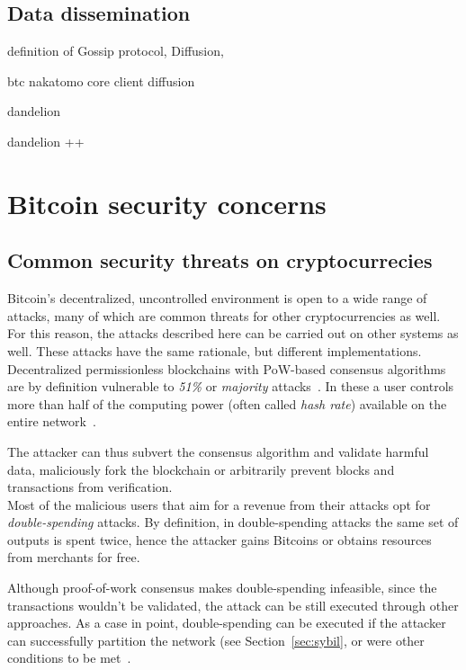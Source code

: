 \documentclass[12pt, letterpaper, twoside]{article}
\begin{document}
\subsection{Data dissemination}\label{sec:dissem}
definition of Gossip protocol, Diffusion,

btc nakatomo core client diffusion

dandelion

dandelion ++




\section{Bitcoin security concerns}\label{sec:securityintro}
\subsection{Common security threats on cryptocurrecies}
Bitcoin's decentralized, uncontrolled environment is open to a wide range of attacks, many of which are common threats for other cryptocurrencies as well. For this reason, the attacks described here can be carried out on other systems as well. These attacks have the same rationale, but different implementations.\\

Decentralized permissionless blockchains with PoW-based consensus algorithms are by definition vulnerable to \textit{51\%} or \textit{majority} attacks~\cite{nakamoto}. In these a user controls more than half of the computing power (often called \textit{hash rate}) available on the entire network~\cite{51atk}.

The attacker can thus subvert the consensus algorithm and validate harmful data, maliciously fork the blockchain or arbitrarily prevent blocks and transactions from verification.\\

Most of the malicious users that aim for a revenue from their attacks opt for \textit{double-spending} attacks. By definition, in double-spending attacks the same set of outputs is spent twice, hence the attacker gains Bitcoins or obtains resources from merchants for free.

Although proof-of-work consensus makes double-spending infeasible, since the transactions wouldn't be validated, the attack can be still executed through other approaches. As a case in point, double-spending can be executed  if the attacker can successfully partition the network (see Section~\ref{sec:sybil}, or were other conditions to be met~\cite{doublespendfastpay}.\\
\end{document}
